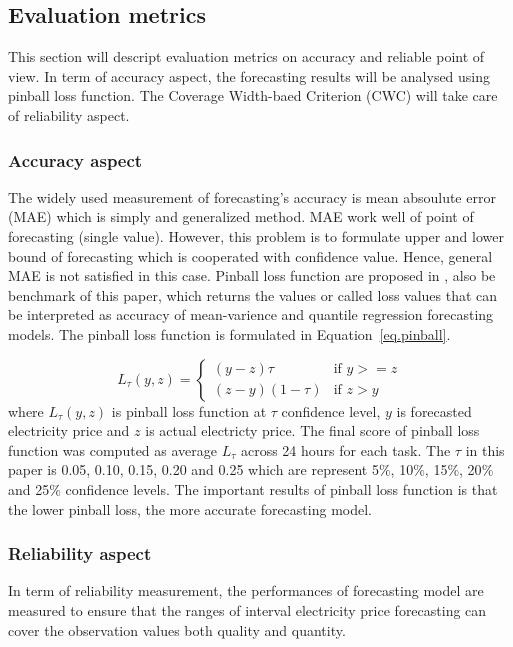 \documentclass[review]{elsarticle}
\begin{document}
    \subsection{Evaluation metrics}
      This section will descript evaluation metrics on accuracy and reliable point of view.
      In term of accuracy aspect, the forecasting results will be analysed using pinball loss function.
      The Coverage Width-baed Criterion (CWC) will take care of reliability aspect.

      \subsubsection{Accuracy aspect}
        The widely used measurement of forecasting's accuracy is mean absoulute error (MAE) which is simply and generalized method.
        MAE work well of point of forecasting (single value).
        However, this problem is to formulate upper and lower bound of forecasting which is cooperated with confidence value.
        Hence, general MAE is not satisfied in this case.
        Pinball loss function are proposed in \cite{Maciejowska2016}, also be benchmark of this paper, which returns the values or called loss values that can be interpreted as accuracy of mean-varience and quantile regression forecasting models.
        The pinball loss function is formulated in Equation~\ref{eq.pinball}.

        \begin{equation}
          L_{\tau}(y,z) =
          \begin{cases}
            (y-z)\tau & \text{if  $y>=z$} \\
            (z-y)(1-\tau) & \text{if  $z>y$}
          \end{cases}
          \label{eq.pinball}
        \end{equation}
        where $L_{\tau}(y,z)$ is pinball loss function at $\tau$ confidence level, $y$ is forecasted electricity price and $z$ is actual electricty price.
        The final score of pinball loss function was computed as average $L_{\tau}$ across 24 hours for each task.
        The $\tau$ in this paper is 0.05, 0.10, 0.15, 0.20 and 0.25 which are represent 5$\%$, 10$\%$, 15$\%$, 20$\%$ and 25$\%$ confidence levels.
        The important results of pinball loss function is that the lower pinball loss, the more accurate forecasting model.

      \subsubsection{Reliability aspect}
        In term of reliability measurement, the performances of forecasting model are measured to ensure that the ranges of interval electricity price forecasting can cover the observation values both quality and quantity.
\end{document}
